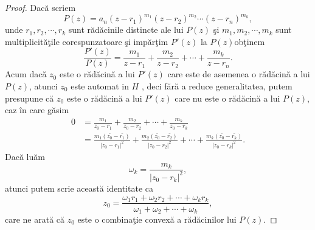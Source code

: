 \documentclass[a4paper,12pt,oneside]{report}
\begin{document}
\begin{proof}
Dac\u{a} scriem
\begin{displaymath}
  P\left ( z \right ) = a_{n}\left ( z - r_{1} \right )^{m_{1}}\left ( z - r_{2} \right )^{m_{2}}\cdots \left ( z - r_{n} \right )^{m_{k}},
\end{displaymath}
unde  \(r_{1} , r_{2}, \cdots, r_{k}\) sunt r\u{a}d\u{a}cinile distincte ale lui \(P\left ( z \right )\) \c{s}i \(m_{1} , m_{2}, \cdots, m_{k}\) sunt multiplicit\u{a}\c{t}ile corespunzatoare \c{s}i imp\u{a}r\c{t}im \({P}'\left ( z \right )\) la \( P\left ( z \right )\)ob\c{t}inem
\begin{displaymath}
  \frac{{P}'\left ( z \right ) }{P\left ( z \right )} = \frac{m_{1}}{z - r_{1}} + \frac{m_{2}}{z - r_{2}}+ \cdots + \frac{m_{k}}{z - r_{n}} .
\end{displaymath}
Acum dac\u{a} \(z_{0}\) este o r\u{a}d\u{a}cin\u{a} a lui \({P}'\left ( z \right )\) care este de asemenea o r\u{a}d\u{a}cin\u{a} a lui \(P\left ( z \right )\), atunci \(z_{0}\) este automat in \(H\) , deci f\u{a}r\u{a} a reduce generalitatea, putem presupune c\u{a} \(z_{0}\)  este o r\u{a}d\u{a}cin\u{a} a lui  \({P}'\left ( z \right )\) care nu este o r\u{a}d\u{a}cin\u{a} a lui \(P\left ( z \right )\), caz \^{i}n care g\u{a}sim
\begin{equation} \nonumber
    \begin{split}
        0 & = \frac{m_{1}}{z_{0} - r_{1}} + \frac{m_{2}}{z_{0} - r_{2}} +\cdots+ \frac{m_{k}}{z_{0} - r_{k}} \\ & = \frac{m_{1}\left (\bar{z_{0}} - \bar{r_{1}}\right )}{\left | z_{0}  - r_{1}\right |^{2}} + \frac{m_{2}\left (\bar{z_{0}} - \bar{r_{2}}\right )}{\left | z_{0}  - r_{2}\right |^{2}} + \cdots+ \frac{m_{k}\left (\bar{z_{0}} - \bar{r_{k}}\right )}{\left | z_{0}  - r_{k}\right |^{2}}.
    \end{split}
\end{equation}
Dac\u{a} lu\u{a}m
\begin{displaymath}
  \omega _{k} =\frac{ m_{k}}{\left | z_{0}  - r_{k}\right |^{2}},
\end{displaymath} atunci putem scrie aceast\u{a} identitate ca
\begin{displaymath}
  z_{0} = \frac{\omega _{1}r_{1} +\omega _{2}r{_2}+\cdots+ \omega _{k}r{_k} }{\omega _{1} + \omega _{2} + \cdots + \omega _{k}},
\end{displaymath}
care ne arat\u{a} c\u{a} \(z_{0}\) este o combina\c{t}ie convex\u{a} a r\u{a}d\u{a}cinilor lui \(P\left ( z \right )\).
\end{proof}
\end{document}
